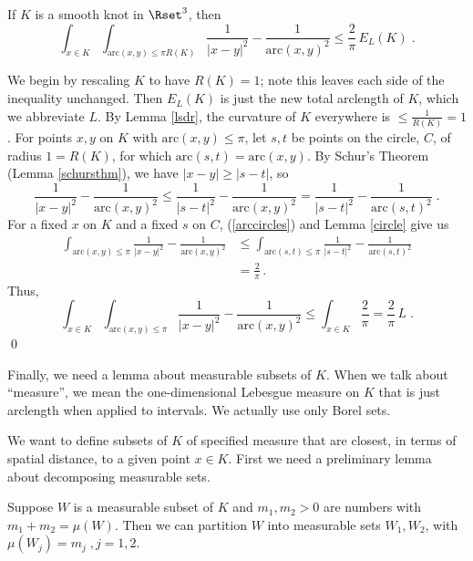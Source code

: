 \documentclass{elsart}
\begin{document}
\begin{lem}  If $K$ is a smooth knot in $\Rset^3$, then
$$\int\nolimits_{x\in
K}\int\nolimits_{\mathrm{arc}(x,y)\leq \pi R(K)} 
\frac{1}{|x-y|^2} - \frac{1}{\mathrm{arc}(x,y)^2} 
\leq \frac{2}{\pi}\,E_L(K)\;.$$
\label{prox}
\end{lem}

\begin{pf} We begin by rescaling $K$ to have $R(K)=1$;
note this leaves each side of the inequality unchanged. 
Then $E_L(K)$  is just the new total arclength of $K$,
which we abbreviate $L$. By Lemma \ref{lsdr}, the
curvature of $K$ everywhere is 
$\leq \frac{1}{R(K)}=1$.  For points
$x,y$ on $K$ with $\mathrm{arc}(x,y) \leq \pi$, let
$s,t$ be points on the circle, $C$, of radius $1=R(K)$,
for which
$\mathrm{arc}(s,t) = \mathrm{arc}(x,y)$.  By Schur's
Theorem (Lemma
\ref{schursthm}), we have $|x-y| \geq |s-t|$, so
\begin{equation}
\frac{1}{|x-y|^2}-\frac{1}{\mathrm{arc}(x,y)^2} \leq 
\frac{1}{|s-t|^2}-\frac{1}{\mathrm{arc}(x,y)^2} = 
\frac{1}{|s-t|^2}-\frac{1}{\mathrm{arc}(s,t)^2}\;.
\label{arccircles}
\end{equation} 
For a fixed $x$ on $K$ and  a fixed $s$ on
$C$, (\ref{arccircles}) and Lemma \ref{circle} give us
\begin{align*}
\int\nolimits_{\mathrm{arc}(x,y)\leq \pi} 
\frac{1}{|x-y|^2} - \frac{1}{\mathrm{arc}(x,y)^2} &\leq
\int\nolimits_{\mathrm{arc}(s,t)\leq \pi}
\frac{1}{|s-t|^2}-\frac{1}{\mathrm{arc}(s,t)^2} \\ 
&= \frac{2}{\pi}\,.
\end{align*} 
Thus, 
$$
\int\nolimits_{x\in
K}\int\nolimits_{\mathrm{arc}(x,y)\leq \pi} 
\frac{1}{|x-y|^2} - \frac{1}{\mathrm{arc}(x,y)^2} \leq
\int\nolimits_{x\in K} \frac{2}{\pi} = \frac{2}{\pi}\,L\;.
$$
\qed
\end{pf} 

Finally, we need a lemma about measurable subsets
of
$K$.   When we talk about ``measure'',
we mean the one-dimensional Lebesgue measure on $K$ that is
just arclength when applied to intervals.  We actually
use only Borel sets.

We want to define subsets of $K$ of specified measure that are
closest, in terms of spatial distance, to a given point
$x\in K$.  First we need a  preliminary lemma about decomposing
measurable sets.


\begin{lem} 
\label{DecomposeASet}
Suppose $W$ is a measurable subset of $K$ and
$m_1,m_2 > 0$ are numbers with $m_1+m_2 =
\mu(W)$.  Then we can partition $W$ into measurable
sets $W_1,W_2$, with $\mu(W_j)=m_j\;, j=1,2$. 
\end{lem}
\end{document}
